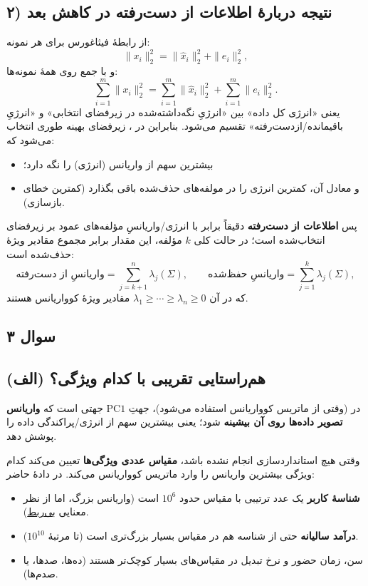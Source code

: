 \documentclass[12pt]{report}
\begin{document}
\subsection*{۲) نتیجه دربارهٔ اطلاعات از دست‌رفته در کاهش بعد}
از رابطهٔ فیثاغورس برای هر نمونه:
\[
\|x_i\|_2^2 = \|\hat x_i\|_2^2 + \|e_i\|_2^2,
\]
و با جمع روی همهٔ نمونه‌ها:
\[
\sum_{i=1}^{m}\|x_i\|_2^2
=
\sum_{i=1}^{m}\|\hat x_i\|_2^2
+
\sum_{i=1}^{m}\|e_i\|_2^2.
\]
یعنی «انرژی کل داده» بین «انرژیِ نگه‌داشته‌شده در زیرفضای انتخابی» و «انرژیِ باقیمانده/از‌دست‌رفته» تقسیم می‌شود. بنابراین در ، زیرفضای بهینه طوری انتخاب می‌شود که:
\begin{itemize}
\item بیشترین سهم از واریانس (انرژی) را نگه دارد؛
\item و معادل آن، کمترین انرژی را در مولفه‌های حذف‌شده باقی بگذارد (کمترین خطای بازسازی).
\end{itemize}
پس \textbf{اطلاعات از دست‌رفته} دقیقاً برابر با انرژی/واریانسِ مؤلفه‌های عمود بر زیرفضای انتخاب‌شده است؛ در حالت کلی $k$ مؤلفه، این مقدار برابر مجموع مقادیر ویژهٔ حذف‌شده است:
\[
\text{واریانسِ از دست‌رفته}=\sum_{j=k+1}^{n}\lambda_j(\Sigma),
\qquad
\text{واریانسِ حفظ‌شده}=\sum_{j=1}^{k}\lambda_j(\Sigma),
\]
که در آن $\lambda_1\ge\cdots\ge\lambda_n\ge 0$ مقادیر ویژهٔ کوواریانس هستند.

\subsection{سوال ۳}

\subsection*{(الف) هم‌راستایی تقریبی  با کدام ویژگی؟}
در  (وقتی از ماتریس کوواریانس استفاده می‌شود)، جهتِ $\text{PC1}$ جهتی است که \textbf{واریانس تصویر داده‌ها روی آن بیشینه} شود؛ یعنی بیشترین سهم از انرژی/پراکندگی داده را پوشش دهد.

وقتی هیچ استانداردسازی انجام نشده باشد، \textbf{مقیاس عددی ویژگی‌ها} تعیین می‌کند کدام ویژگی بیشترین واریانس را وارد ماتریس کوواریانس می‌کند. در دادهٔ حاضر:
\begin{itemize}
\item \textbf{شناسهٔ کاربر} یک عدد ترتیبی با مقیاس حدود $10^6$ است (واریانس بزرگ، اما از نظر معنایی \underline{بی‌ربط}).
\item \textbf{درآمد سالیانه} حتی از شناسه هم در مقیاس بسیار بزرگ‌تری است (تا مرتبهٔ $10^{10}$).
\item سن، زمان حضور و نرخ تبدیل در مقیاس‌های بسیار کوچک‌تر هستند (ده‌ها، صدها، یا صدم‌ها).
\end{itemize}
\end{document}
